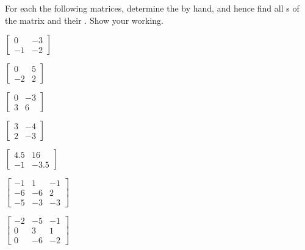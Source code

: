 \begin{exercise} \label{ex:} 
For each the following matrices, determine the  by hand, and hence find all s of the matrix and their .
Show your working.

\begin{parts}
\item \(\begin{bmatrix} 0 & -3
\\-1 & -2 \end{bmatrix}\)

\item \(\begin{bmatrix} 0 & 5
\\-2 & 2 \end{bmatrix}\)

\item \(\begin{bmatrix} 0 & -3
\\3 & 6 \end{bmatrix}\)

\item \(\begin{bmatrix} 3 & -4
\\2 & -3 \end{bmatrix}\)

\item \(\begin{bmatrix} 4.5 & 16
\\-1 & -3.5 \end{bmatrix}\)

\item \(\begin{bmatrix} -1 & 1 & -1
\\-6 & -6 & 2
\\-5 & -3 & -3 \end{bmatrix}\)

\item \(\begin{bmatrix} -2 & -5 & -1
\\0 & 3 & 1
\\0 & -6 & -2 \end{bmatrix}\)


\end{parts}
\end{exercise}
